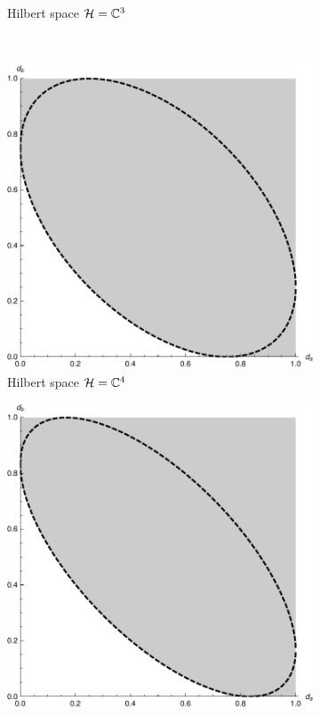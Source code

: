 \begin{figure}
\begin{subfigure}[t]{0.4\textwidth}
    \caption{Hilbert space $\mathcal{H} = \mathbb{C}^3$}
  \end{subfigure}\\
  \begin{subfigure}[t]{0.4\textwidth}
    \includegraphics[width=\textwidth]{fourier-ur-4}
    \caption{Hilbert space $\mathcal{H} = \mathbb{C}^4$}
  \end{subfigure}\quad
  \begin{subfigure}[t]{0.4\textwidth}
    \includegraphics[width=\textwidth]{fourier-ur-6}

\end{subfigure}
\end{figure}
